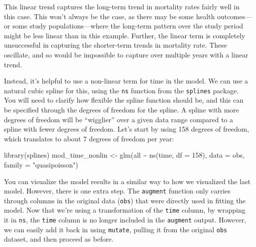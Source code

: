 \documentclass[
]{book}
\newenvironment{Shaded}{\begin{snugshade}}{\end{snugshade}}
\newcommand{\AttributeTok}[1]{\textcolor[rgb]{0.77,0.63,0.00}{#1}}
\newcommand{\DecValTok}[1]{\textcolor[rgb]{0.00,0.00,0.81}{#1}}
\newcommand{\FunctionTok}[1]{\textcolor[rgb]{0.00,0.00,0.00}{#1}}
\newcommand{\NormalTok}[1]{#1}
\newcommand{\OtherTok}[1]{\textcolor[rgb]{0.56,0.35,0.01}{#1}}
\newcommand{\SpecialCharTok}[1]{\textcolor[rgb]{0.00,0.00,0.00}{#1}}
\newcommand{\StringTok}[1]{\textcolor[rgb]{0.31,0.60,0.02}{#1}}
\begin{document}
This linear trend captures the long-term trend in mortality rates fairly well in
this case. This won't always be the case, as there may be some health
outcomes---or some study populations---where the long-term pattern over the
study period might be less linear than in this example. Further, the linear
term is completely unsuccessful in capturing the shorter-term trends in mortality
rate. These oscillate, and so would be impossible to capture over multiple
years with a linear trend.

Instead, it's helpful to use a non-linear term for time in the model. We can
use a natural cubic spline for this, using the \texttt{ns} function from the \texttt{splines}
package. You will need to clarify how flexible the spline function should be,
and this can be specified through the degrees of freedom for the spline. A
spline with more degrees of freedom will be ``wigglier'' over a given data range
compared to a spline with fewer degrees of freedom. Let's start by using
158 degrees of freedom, which translates to about 7 degrees of freedom per year:

\begin{Shaded}
\begin{Highlighting}[]
\FunctionTok{library}\NormalTok{(splines)}
\NormalTok{mod\_time\_nonlin }\OtherTok{\textless{}{-}} \FunctionTok{glm}\NormalTok{(all }\SpecialCharTok{\textasciitilde{}} \FunctionTok{ns}\NormalTok{(time, }\AttributeTok{df =} \DecValTok{158}\NormalTok{), }
                       \AttributeTok{data =}\NormalTok{ obs, }\AttributeTok{family =} \StringTok{"quasipoisson"}\NormalTok{)}
\end{Highlighting}
\end{Shaded}

You can visualize the model results in a similar way to how we visualized the
last model. However, there is one extra step. The \texttt{augment} function only
carries through columns in the original data (\texttt{obs}) that were directly used
in fitting the model. Now that we're using a transformation of the \texttt{time}
column, by wrapping it in \texttt{ns}, the \texttt{time} column is no longer included in the
\texttt{augment} output. However, we can easily add it back in using \texttt{mutate},
pulling it from the original \texttt{obs} dataset, and then proceed as before.
\end{document}
